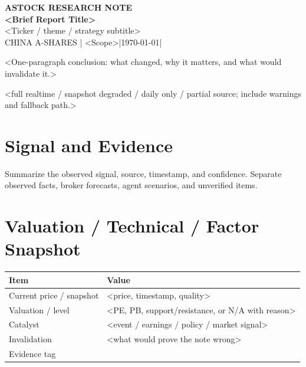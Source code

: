\documentclass[a4paper,11pt,fontset=none]{ctexart}
\newcommand{\reporttitle}{<Brief Report Title>}
\newcommand{\reportsubtitle}{<Ticker / theme / strategy subtitle>}
\newcommand{\reportkicker}{ASTOCK RESEARCH NOTE}
\newcommand{\reportscope}{CHINA A-SHARES | <Scope>}
\newcommand{\reportdate}{\today}
\newcommand{\reportdatacutoff}{<Data cutoff>}
\newcommand{\reporthouseview}{<One-paragraph conclusion: what changed, why it matters, and what would invalidate it.>}
\newcommand{\reportquality}{<full realtime / snapshot degraded / daily only / partial source; include warnings and fallback path.>}
\begin{document}
\begin{center}
{\sffamily\small\bfseries\color{steelgrey} \reportkicker}\\[3pt]
{\LARGE\bfseries\color{navy} \reporttitle}\\[5pt]
{\large\color{steelgrey} \reportsubtitle}\\[4pt]
{\small\color{mutedgrey} \reportscope \quad|\quad \reportdate \quad|\quad \reportdatacutoff}
\end{center}
\vspace{0.7em}

\begin{dashboardbox}
\begin{houseviewbox}
\reporthouseview
\end{houseviewbox}
\begin{sourcequalitybox}
\reportquality
\end{sourcequalitybox}
\end{dashboardbox}

\section{Signal and Evidence}

\begin{exhibitbox}
Summarize the observed signal, source, timestamp, and confidence. Separate observed facts, broker forecasts, agent scenarios, and unverified items.
\end{exhibitbox}

\section{Valuation / Technical / Factor Snapshot}

\begin{tabularx}{\textwidth}{L{3cm}X}
\toprule
\textbf{Item} & \textbf{Value} \\
\midrule
Current price / snapshot & <price, timestamp, quality> \\
Valuation / level & <PE, PB, support/resistance, or N/A with reason> \\
Catalyst & <event / earnings / policy / market signal> \\
Invalidation & <what would prove the note wrong> \\
Evidence tag &  \\
\bottomrule
\end{tabularx}
\end{document}
